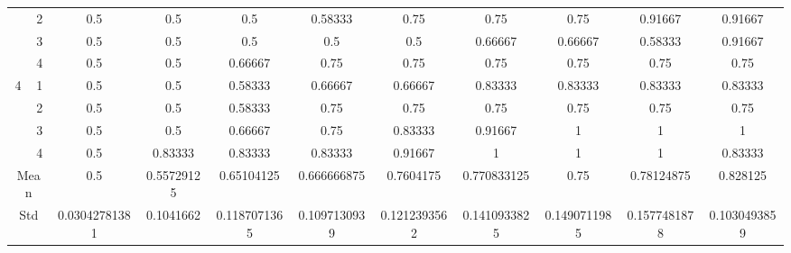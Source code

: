 \documentclass[draft,dvipsnames]{drexel-thesis}
\begin{document}
\begin{thesis}
\begin{table}[!t]
{\begin{tabular}{|c|c|c|c|c|c|c|c|c|c|c|}
                      & 2                   & 0.5           & 0.5        & 0.5          & 0.58333      & 0.75         & 0.75         & 0.75         & 0.91667      & 0.91667      \\ \cline{2-11} 
                      & 3                   & 0.5           & 0.5        & 0.5          & 0.5          & 0.5          & 0.66667      & 0.66667      & 0.58333      & 0.91667      \\ \cline{2-11} 
                      & 4                   & 0.5           & 0.5        & 0.66667      & 0.75         & 0.75         & 0.75         & 0.75         & 0.75         & 0.75         \\ \hline
\multirow{4}{*}{4}    & 1                   & 0.5           & 0.5        & 0.58333      & 0.66667      & 0.66667      & 0.83333      & 0.83333      & 0.83333      & 0.83333      \\ \cline{2-11} 
                      & 2                   & 0.5           & 0.5        & 0.58333      & 0.75         & 0.75         & 0.75         & 0.75         & 0.75         & 0.75         \\ \cline{2-11} 
                      & 3                   & 0.5           & 0.5        & 0.66667      & 0.75         & 0.83333      & 0.91667      & 1            & 1            & 1            \\ \cline{2-11} 
                      & 4                   & 0.5           & 0.83333    & 0.83333      & 0.83333      & 0.91667      & 1            & 1            & 1            & 0.83333      \\ \hline
\multicolumn{2}{|c|}{Mean}                  & 0.5           & 0.55729125 & 0.65104125   & 0.666666875  & 0.7604175    & 0.770833125  & 0.75         & 0.78124875   & 0.828125     \\ \hline
\multicolumn{2}{|c|}{Std}                   & 0.03042781381 & 0.1041662  & 0.1187071365 & 0.1097130939 & 0.1212393562 & 0.1410933825 & 0.1490711985 & 0.1577481878 & 0.1030493859 \\ \hline
\end{tabular}}
\end{table}


\end{thesis}
\end{document}
